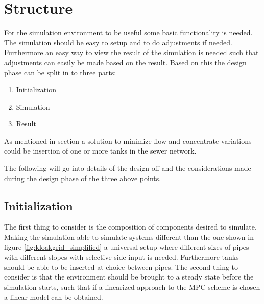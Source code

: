 \section{Structure}\label{sec:Structure}
For the simulation environment to be useful some basic functionality is needed. The simulation should be easy to setup and to do adjustments if needed. 
Furthermore an easy way to view the result of the simulation is needed such that adjustments can easily be made based on the result.
Based on this the design phase can be split in to three parts:

\begin{enumerate}
	\item Initialization
	\item Simulation
	\item Result
\end{enumerate}

As mentioned in section  a solution to minimize flow and concentrate variations could be insertion of one or more tanks in the sewer network.

The following will go into details of the design off and the considerations made during the design phase of the three above points.

\subsection*{Initialization} 

The first thing to consider is the composition of components desired to simulate. Making the simulation able to simulate systems different than the one shown in figure \ref{fig:kloakgrid_simplified} a universal setup where different sizes of pipes with different slopes with selective side input is needed. Furthermore tanks should be able to be inserted at choice between pipes.
The second thing to consider is that the environment should be brought to a steady state before the simulation starts, such that if a linearized approach to the MPC scheme is chosen a linear model can be obtained. 

